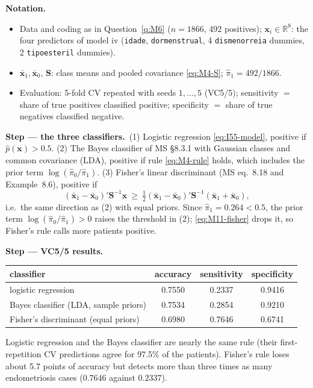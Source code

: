 \documentclass[11pt,a4paper]{article}
\numberwithin{equation}{questao}   %
\newenvironment{notacao}{\par\smallskip\noindent\textbf{Notation.}\begin{itemize}[leftmargin=1.4em,topsep=1pt,itemsep=0pt]\small}{\end{itemize}}
\newcommand{\passo}[2]{\par\smallskip\noindent\textbf{Step --- #1.}~#2}
\begin{document}
\begin{sol}
\begin{notacao}
\item Data and coding as in Question~\ref{q:M6} ($n=1866$, 492 positives); $\mathbf x_i\in\mathbb R^8$: the four
  predictors of model iv (\texttt{idade}, \texttt{dormenstrual}, 4 \texttt{dismenorreia} dummies, 2
  \texttt{tipoesteril} dummies).
\item $\bar{\mathbf x}_1,\bar{\mathbf x}_0$, $\mathbf S$: class means and pooled covariance \eqref{eq:M4-S};
  $\hat\pi_1=492/1866$.
\item Evaluation: 5-fold CV repeated with seeds $1,\dots,5$ (VC5/5); sensitivity $=$ share of true
  positives classified positive; specificity $=$ share of true negatives classified negative.
\end{notacao}

\passo{the three classifiers}{(1) Logistic regression \eqref{eq:I55-model}, positive if $\hat p(\mathbf x)>0.5$.
(2) The Bayes classifier of MS §8.3.1 with Gaussian classes and common covariance (LDA), positive if
rule \eqref{eq:M4-rule} holds, which includes the prior term $\log(\hat\pi_0/\hat\pi_1)$. (3) Fisher's
linear discriminant (MS eq.~8.18 and Example~8.6), positive if
\begin{equation}\label{eq:M11-fisher}
(\bar{\mathbf x}_1-\bar{\mathbf x}_0)'\mathbf S^{-1}\mathbf x\ \ge\ \tfrac12(\bar{\mathbf x}_1-\bar{\mathbf x}_0)'\mathbf S^{-1}(\bar{\mathbf x}_1+\bar{\mathbf x}_0),
\end{equation}
i.e.\ the same direction as (2) with equal priors. Since $\hat\pi_1=0.264<0.5$, the prior term
$\log(\hat\pi_0/\hat\pi_1)>0$ raises the threshold in (2); \eqref{eq:M11-fisher} drops it, so Fisher's
rule calls more patients positive.}

\passo{VC5/5 results}{
\begin{center}\begin{tabular}{lccc}\toprule
classifier & accuracy & sensitivity & specificity\\\midrule
logistic regression & 0.7550 & 0.2337 & 0.9416\\
Bayes classifier (LDA, sample priors) & 0.7534 & 0.2854 & 0.9210\\
Fisher's discriminant (equal priors) & 0.6980 & 0.7646 & 0.6741\\\bottomrule\end{tabular}\end{center}
Logistic regression and the Bayes classifier are nearly the same rule (their first-repetition CV
predictions agree for 97.5\% of the patients). Fisher's rule loses about 5.7 points of accuracy but
detects more than three times as many endometriosis cases ($0.7646$ against $0.2337$).}


\end{sol}
\end{document}
